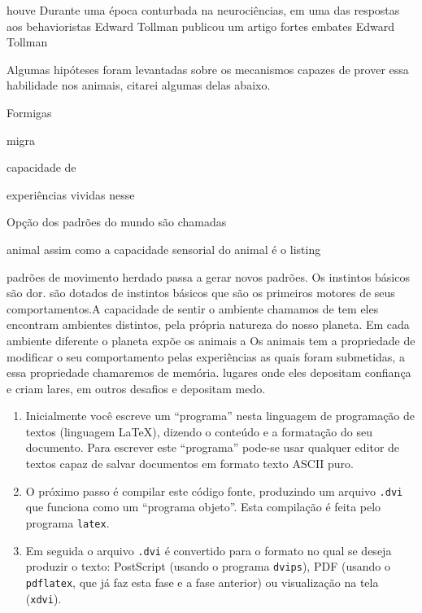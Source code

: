 houve Durante uma época conturbada na neurociências, em uma das respostas aos behavioristas Edward Tollman publicou um artigo  fortes embates Edward Tollman 

Algumas hipóteses foram levantadas sobre os mecanismos capazes de prover essa habilidade nos animais, citarei algumas delas abaixo.



Formigas



migra



 capacidade de 



experiências vividas nesse 

Opção dos padrões do mundo são chamadas


animal assim como a capacidade sensorial do animal é o listing

padrões de movimento herdado passa a gerar novos padrões. Os instintos básicos são dor. são dotados de instintos básicos que são os primeiros motores de seus comportamentos.A capacidade de sentir o ambiente chamamos de tem eles encontram ambientes distintos, pela própria natureza do nosso planeta. Em cada ambiente diferente o planeta expõe os animais a Os animais tem a propriedade de modificar o seu comportamento pelas experiências as quais foram submetidas, a essa propriedade chamaremos de memória. lugares onde eles depositam confiança e criam lares, em outros desafios e depositam medo.


%
\begin{enumerate}
\item Inicialmente você escreve um ``programa'' nesta linguagem de
programação de textos (linguagem \LaTeX), dizendo o conteúdo e a
formatação do seu documento.  Para escrever este ``programa'' pode-se
usar qualquer editor de textos capaz de salvar documentos em formato
texto ASCII puro.
\item O próximo passo é compilar este código fonte, produzindo um arquivo
\texttt{.dvi} que funciona como um ``programa objeto''. Esta compilação
é feita pelo programa \texttt{latex}.
\item Em seguida o arquivo \texttt{.dvi} é convertido para o formato no
qual se deseja produzir o texto: PostScript (usando o programa
\texttt{dvips}), PDF (usando o \texttt{pdflatex}, que já faz esta fase
e a fase anterior) ou visualização na tela (\texttt{xdvi}).
\end{enumerate}


